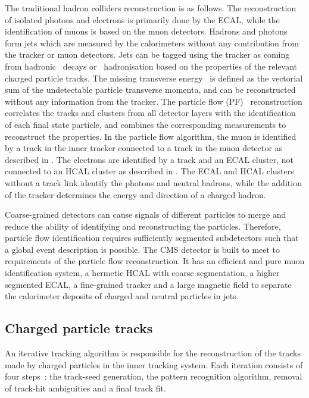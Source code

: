 The traditional hadron colliders reconstruction is as follows. The reconstruction of isolated photons and electrons is primarily done by the ECAL, while the identification of muons is based on the muon detectors. Hadrons and photons form jets which are measured by the calorimeters without any contribution from the tracker or muon detectors. Jets can be tagged using the tracker as coming from hadronic \Ptau\ decays or \Pbottom\ hadronisation based on the properties of the relevant charged particle tracks. The missing transverse energy \ptmisvec\ is defined as the vectorial sum of the undetectable particle transverse momenta, and can be reconstructed without any information from the tracker. 
The particle flow (PF)~\cite{CMS-PRF-14-001} reconstruction correlates the tracks and clusters from all detector layers with the identification of each final state particle, and combines the corresponding measurements to reconstruct the properties. In the particle flow algorithm, the muon is identified by a track in the inner tracker connected to a track in the muon detector as described in . The electrons are identified by a track and an ECAL cluster, not connected to an HCAL cluster as described in . The ECAL and HCAL clusters without a track link identify the photons and neutral hadrons, while the addition of the tracker determines the energy and direction of a charged hadron. 


Coarse-grained detectors can cause signals of different particles to merge and reduce the ability of identifying and reconstructing the particles. Therefore, particle flow identification requires sufficiently segmented subdetectors such that a global event description is possible. The CMS detector is built to meet to requirements of the particle flow reconstruction. It has an efficient and pure muon identification system, a hermetic HCAL with coarse segmentation, a higher segmented ECAL, a fine-grained tracker and a large magnetic field to separate the calorimeter deposits of charged and neutral particles in jets. 

\subsection{Charged particle tracks}
An iterative tracking algorithm is responsible for the reconstruction of the tracks made by charged particles in the inner tracking system. Each iteration consists of four steps~\cite{Bayatian:922757}: the track-seed generation, the pattern recognition algorithm, removal of track-hit ambiguities and a final track fit. 

